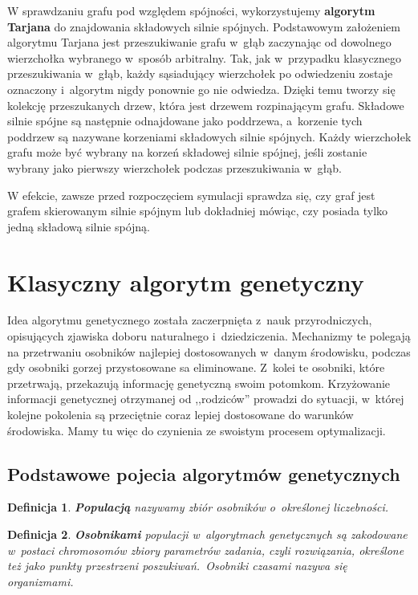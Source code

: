\documentclass[twoside,12pt]{report}
\newtheorem{definition}{Definicja} %
\begin{document}
W sprawdzaniu grafu pod względem spójności, wykorzystujemy \textbf{algorytm Tarjana} do znajdowania składowych silnie spójnych. Podstawowym założeniem algorytmu Tarjana jest przeszukiwanie grafu w~głąb zaczynając od dowolnego wierzchołka wybranego w~sposób arbitralny. Tak, jak w~przypadku klasycznego przeszukiwania w~głąb, każdy sąsiadujący wierzchołek po odwiedzeniu zostaje oznaczony i~algorytm nigdy ponownie go nie odwiedza. Dzięki temu tworzy się kolekcję przeszukanych drzew, która jest drzewem rozpinającym grafu. Składowe silnie spójne są następnie odnajdowane jako poddrzewa, a~korzenie tych poddrzew są nazywane korzeniami składowych silnie spójnych. Każdy wierzchołek grafu może być wybrany na korzeń składowej silnie spójnej, jeśli zostanie wybrany jako pierwszy wierzchołek podczas przeszukiwania w~głąb.

W efekcie, zawsze przed rozpoczęciem symulacji sprawdza się, czy graf jest grafem skierowanym silnie spójnym lub dokładniej mówiąc, czy posiada tylko jedną składową silnie spójną.

\section{Klasyczny algorytm genetyczny}

Idea algorytmu genetycznego została zaczerpnięta z~nauk przyrodniczych, opisujących zjawiska doboru naturalnego i~dziedziczenia. Mechanizmy te polegają na
przetrwaniu osobników najlepiej dostosowanych w~danym środowisku, podczas gdy osobniki gorzej przystosowane sa eliminowane. Z~kolei te osobniki, które przetrwają, przekazują informację genetyczną swoim potomkom. Krzyżowanie informacji genetycznej otrzymanej od ,,rodziców'' prowadzi do sytuacji, w~której kolejne pokolenia są przeciętnie coraz lepiej dostosowane do warunków środowiska. Mamy tu więc do czynienia ze swoistym procesem optymalizacji. 

\subsection{Podstawowe pojecia algorytmów genetycznych}

\begin{definition}
\textbf{Populacją} nazywamy zbiór osobników o~określonej liczebności.
\end{definition}

\begin{definition}
\textbf{Osobnikami} populacji w~algorytmach genetycznych są zakodowane w~postaci chromosomów zbiory parametrów zadania, czyli rozwiązania, określone też jako punkty
przestrzeni poszukiwań.~Osobniki czasami nazywa się organizmami.
\end{definition}
\end{document}
